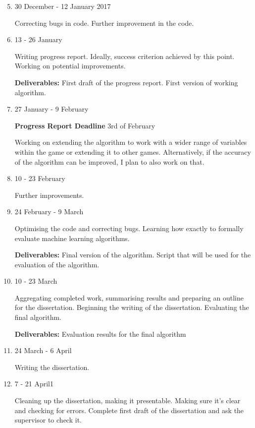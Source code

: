\documentclass[12pt,a4paper]{article}
\begin{document}
\begin{enumerate}
\setcounter{enumi}{4}
\item

30 December - 12 January 2017

Correcting bugs in code. Further improvement in the code. 

\item
13 - 26 January

Writing progress report. Ideally, success criterion achieved by this point. Working on potential improvements.

\textbf{Deliverables:} First draft of the progress report. First version of working algorithm.

\item
27 January - 9 February

\textbf{Progress Report Deadline} 3rd of February

Working on extending the algorithm to work with a wider range of variables within the game or extending it to other games.
 Alternatively, if the accuracy of the algorithm can be improved, I plan to also work on that.

\item
10 - 23 February

Further improvements.

\item
24 February - 9 March

Optimising the code and correcting bugs. Learning how exactly to formally evaluate machine learning algorithms.

\textbf{Deliverables:} Final version of the algorithm. Script that will be used for the evaluation of the algorithm.

\item
10 - 23 March

Aggregating completed work, summarising results and preparing an outline for the dissertation. Beginning the writing of the dissertation. Evaluating the final algorithm.

\textbf{Deliverables:} Evaluation results for the final algorithm

\item

24 March - 6 April

Writing the dissertation.

\item

7 - 21 April1

Cleaning up the dissertation, making it presentable. Making sure it's clear and checking for errors. Complete first draft of the dissertation and ask the supervisor to check it.


\end{enumerate}
\end{document}
